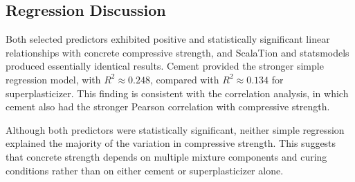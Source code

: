 \subsection{Regression Discussion}

Both selected predictors exhibited positive and statistically significant
linear relationships with concrete compressive strength, and ScalaTion and
statsmodels produced essentially identical results. Cement provided the
stronger simple regression model, with $R^2 \approx 0.248$, compared with
$R^2 \approx 0.134$ for superplasticizer. This finding is consistent with the
correlation analysis, in which cement also had the stronger Pearson
correlation with compressive strength.

Although both predictors were statistically significant, neither simple
regression explained the majority of the variation in compressive strength.
This suggests that concrete strength depends on multiple mixture components
and curing conditions rather than on either cement or superplasticizer alone.